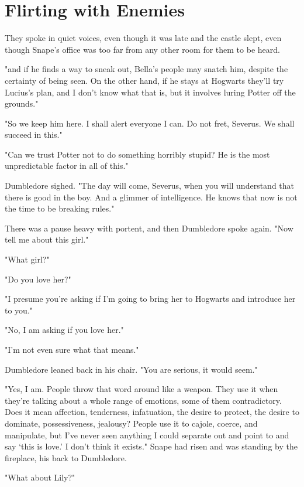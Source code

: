 
\chapter{Flirting with Enemies}

They spoke in quiet voices, even though it was late and the castle slept, even though Snape's office was too far from any other room for them to be heard.

"{\el}and if he finds a way to sneak out, Bella's people may snatch him, despite the certainty of being seen. On the other hand, if he stays at Hogwarts they'll try Lucius's plan, and I don't know what that is, but it involves luring Potter off the grounds."

"So we keep him here. I shall alert everyone I can. Do not fret, Severus. We shall succeed in this."

"Can we trust Potter not to do something horribly stupid? He is the most unpredictable factor in all of this."

Dumbledore sighed. "The day will come, Severus, when you will understand that there is good in the boy. And a glimmer of intelligence. He knows that now is not the time to be breaking rules."

There was a pause heavy with portent, and then Dumbledore spoke again. "Now tell me about this girl."

"What girl?"

"Do you love her?"

"I presume you're asking if I'm going to bring her to Hogwarts and introduce her to you."

"No, I am asking if you love her."

"I'm not even sure what that means."

Dumbledore leaned back in his chair. "You are serious, it would seem."

"Yes, I am. People throw that word around like a weapon. They use it when they're talking about a whole range of emotions, some of them contradictory. Does it mean affection, tenderness, infatuation, the desire to protect, the desire to dominate, possessiveness, jealousy{\el}? People use it to cajole, coerce, and manipulate, but I've never seen anything I could separate out and point to and say `this is love.' I don't think it exists." Snape had risen and was standing by the fireplace, his back to Dumbledore.

"What about Lily?"


